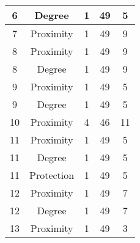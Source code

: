 \documentclass[results.tex]{subfiles}
\begin{document}
\begin{center}
\begin{tabular}{| c || c | c | c | c |}
            \hline
            6                       & Degree                       & 1                      & 49                      & 5                    \\
            \hline
            7                       & Proximity                    & 1                      & 49                      & 9                    \\
            \hline
            8                       & Proximity                    & 1                      & 49                      & 9                    \\
            \hline
            8                       & Degree                       & 1                      & 49                      & 9                    \\
            \hline
            9                       & Proximity                    & 1                      & 49                      & 5                    \\
            \hline
            9                       & Degree                       & 1                      & 49                      & 5                    \\
            \hline
            10                      & Proximity                    & 4                      & 46                      & 11                   \\
            \hline
            11                      & Proximity                    & 1                      & 49                      & 5                    \\
            \hline
            11                      & Degree                       & 1                      & 49                      & 5                    \\
            \hline
            11                      & Protection                   & 1                      & 49                      & 5                    \\
            \hline
            12                      & Proximity                    & 1                      & 49                      & 7                    \\
            \hline
            12                      & Degree                       & 1                      & 49                      & 7                    \\
            \hline
            13                      & Proximity                    & 1                      & 49                      & 3                    \\

\end{tabular}
\end{center}
\end{document}
